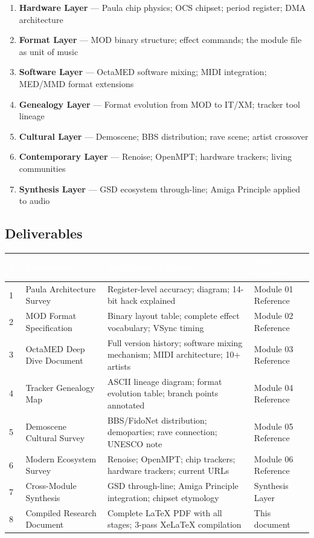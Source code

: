\documentclass[11pt,letterpaper]{article}
\newcommand{\tableheader}[1]{\textbf{\sffamily\textcolor{white}{#1}}}
\begin{document}
\begin{enumerate}[leftmargin=1.5em]
  \item \textbf{Hardware Layer} --- Paula chip physics; OCS chipset; period register; DMA architecture
  \item \textbf{Format Layer} --- MOD binary structure; effect commands; the module file as unit of music
  \item \textbf{Software Layer} --- OctaMED software mixing; MIDI integration; MED/MMD format extensions
  \item \textbf{Genealogy Layer} --- Format evolution from MOD to IT/XM; tracker tool lineage
  \item \textbf{Cultural Layer} --- Demoscene; BBS distribution; rave scene; artist crossover
  \item \textbf{Contemporary Layer} --- Renoise; OpenMPT; hardware trackers; living communities
  \item \textbf{Synthesis Layer} --- GSD ecosystem through-line; Amiga Principle applied to audio
\end{enumerate}

\subsection{Deliverables}

\begin{center}
\begin{tabularx}{\textwidth}{C{0.5cm}L{4cm}L{4cm}L{4.5cm}}
\toprule
{}
\tableheader{\#} & \tableheader{Deliverable} & \tableheader{Acceptance Criteria} & \tableheader{Spec Source} \\
 & Paula Architecture Survey & Register-level accuracy; diagram; 14-bit hack explained & Module 01 Reference \\
2 & MOD Format Specification & Binary layout table; complete effect vocabulary; VSync timing & Module 02 Reference \\
3 & OctaMED Deep Dive Document & Full version history; software mixing mechanism; MIDI architecture; 10+ artists & Module 03 Reference \\
4 & Tracker Genealogy Map & ASCII lineage diagram; format evolution table; branch points annotated & Module 04 Reference \\
5 & Demoscene Cultural Survey & BBS/FidoNet distribution; demoparties; rave connection; UNESCO note & Module 05 Reference \\
6 & Modern Ecosystem Survey & Renoise; OpenMPT; chip trackers; hardware trackers; current URLs & Module 06 Reference \\
7 & Cross-Module Synthesis & GSD through-line; Amiga Principle integration; chipset etymology & Synthesis Layer \\
8 & Compiled Research Document & Complete LaTeX PDF with all stages; 3-pass XeLaTeX compilation & This document \\
\bottomrule
\end{tabularx}
\end{center}
\end{document}
